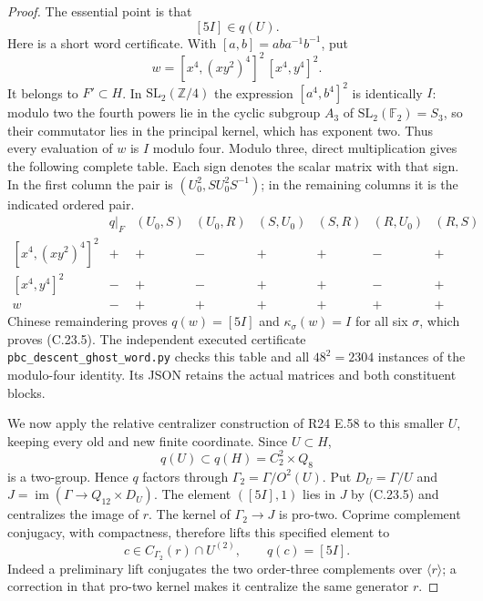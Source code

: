 \begin{proof}
The essential point is that
\[
                       [5I]\in q(U).
 \tag{C.23.5}
\]
Here is a short word certificate. With
$[a,b]=aba^{-1}b^{-1}$, put
\[
 w=[x^4,(xy^2)^4]^2\,[x^4,y^4]^2.
 \tag{C.23.6}
\]
It belongs to $F'\subset H$. In
$\mathrm{SL}_2(\mathbb Z/4)$ the expression
$[a^4,b^4]^2$ is identically $I$: modulo two the
fourth powers lie in the cyclic subgroup $A_3$ of
$\mathrm{SL}_2(\mathbb F_2)=S_3$, so their
commutator lies in the principal kernel, which has
exponent two. Thus every evaluation of $w$ is $I$
modulo four.
Modulo three, direct multiplication gives the following
complete table. Each sign denotes the scalar matrix
with that sign. In the first column the pair is
$(U_0^2,SU_0^2S^{-1})$; in the remaining columns it
is the indicated ordered pair.
\[
\begin{array}{c|c|rrrrrr}
 &q|_F&(U_0,S)&(U_0,R)&(S,U_0)&(S,R)&(R,U_0)&(R,S)\\ \hline
 {[x^4,(xy^2)^4]^2}&+&+&-&+&+&-&+\\
 {[x^4,y^4]^2}&-&+&-&+&+&-&+\\ \hline
 w&-&+&+&+&+&+&+
\end{array}
\]
Chinese remaindering proves $q(w)=[5I]$ and
$\kappa_\sigma(w)=I$ for all six $\sigma$,
which proves (C.23.5). The independent executed
certificate \texttt{pbc\_descent\_ghost\_word.py}
checks this table and all $48^2=2304$ instances
of the modulo-four identity. Its JSON retains the
actual matrices and both constituent blocks.

We now apply the relative centralizer construction of
R24 E.58 to this smaller $U$, keeping every old and
new finite coordinate. Since $U\subset H$,
\[
               q(U)\subset q(H)=C_2^2\times Q_8
\]
is a two-group. Hence $q$ factors through
$\Gamma_2=\Gamma/O^2(U)$. Put
$D_U=\Gamma/U$ and
$J=\operatorname{im}(\Gamma\to Q_{12}\times D_U)$.
The element $([5I],1)$ lies in $J$ by (C.23.5)
and centralizes the image of $r$.
The kernel of $\Gamma_2\to J$ is pro-two.
Coprime complement conjugacy, with compactness,
therefore lifts this specified element to
\[
 c\in C_{\Gamma_2}(r)\cap U^{(2)},\qquad
                    q(c)=[5I].
 \tag{C.23.7}
\]
Indeed a preliminary lift conjugates the two
order-three complements over $\langle r\rangle$;
a correction in that pro-two kernel makes it
centralize the same generator $r$.


\end{proof}
